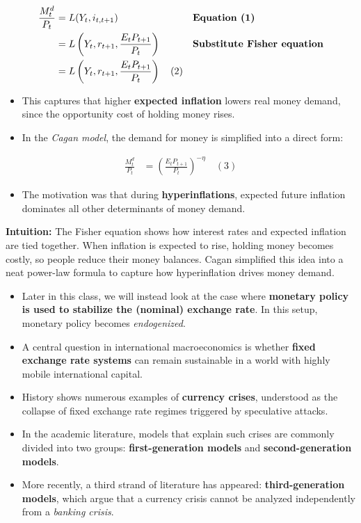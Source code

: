 \documentclass[12pt]{article}
\begin{document}
\singlespacing
\begin{align}
\frac{M_t^d}{P_t} &= L(Y_t, i_{t,t+1}) && \text{\textbf{Equation (1)}} \\
                   &= L\left(Y_t, r_{t+1}, \frac{E_t P_{t+1}}{P_t}\right) && \text{\textbf{Substitute Fisher equation}} \\
                   &= L\left(Y_t, r_{t+1}, \frac{E_t P_{t+1}}{P_t}\right) \quad (2)
\end{align}

\begin{itemize}
    \item This captures that higher \textbf{expected inflation} lowers real money demand, since the opportunity cost of holding money rises.  
    \item In the \textit{Cagan model}, the demand for money is simplified into a direct form:  
\end{itemize}

\singlespacing
\begin{align}
\frac{M_t^d}{P_t} &= \left(\frac{E_t P_{t+1}}{P_t}\right)^{-\eta} \quad (3)
\end{align}

\begin{itemize}
    \item The motivation was that during \textbf{hyperinflations}, expected future inflation dominates all other determinants of money demand.  
\end{itemize}

\textbf{Intuition:} The Fisher equation shows how interest rates and expected inflation are tied together. When inflation is expected to rise, holding money becomes costly, so people reduce their money balances. Cagan simplified this idea into a neat power-law formula to capture how hyperinflation drives money demand.

\begin{itemize}
    \item Later in this class, we will instead look at the case where \textbf{monetary policy is used to stabilize the (nominal) exchange rate}. In this setup, monetary policy becomes \textit{endogenized}.  
    \item A central question in international macroeconomics is whether \textbf{fixed exchange rate systems} can remain sustainable in a world with highly mobile international capital.  
    \item History shows numerous examples of \textbf{currency crises}, understood as the collapse of fixed exchange rate regimes triggered by speculative attacks.  
    \item In the academic literature, models that explain such crises are commonly divided into two groups: \textbf{first-generation models} and \textbf{second-generation models}.  
    \item More recently, a third strand of literature has appeared: \textbf{third-generation models}, which argue that a currency crisis cannot be analyzed independently from a \textit{banking crisis}.  
\end{itemize}
\end{document}
